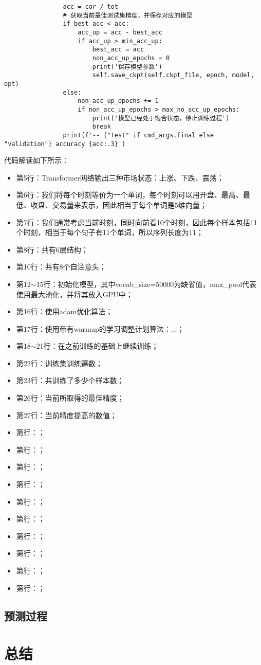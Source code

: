 \begin{lstlisting}
                acc = cor / tot
                # 获取当前最佳测试集精度，并保存对应的模型
                if best_acc < acc:
                    acc_up = acc - best_acc
                    if acc_up > min_acc_up:
                        best_acc = acc
                        non_acc_up_epochs = 0
                        print('保存模型参数')
                        self.save_ckpt(self.ckpt_file, epoch, model, opt)
                else:
                    non_acc_up_epochs += 1
                    if non_acc_up_epochs > max_no_acc_up_epochs:
                        print('模型已经处于饱合状态，停止训练过程')
                        break
                print(f'-- {"test" if cmd_args.final else "validation"} accuracy {acc:.3}')
\end{lstlisting}
代码解读如下所示：
\begin{itemize}
    \item 第5行：Transformer网络输出三种市场状态：上涨、下跌、震荡；
    \item 第6行：我们将每个时刻等价为一个单词，每个时刻可以用开盘、最高、最低、收盘、交易量来表示，因此相当于每个单词是5维向量；
    \item 第7行：我们通常考虑当前时刻，同时向前看10个时刻，因此每个样本包括11个时刻，相当于每个句子有11个单词，所以序列长度为11；
    \item 第8行：共有6层结构；
    \item 第10行：共有8个自注意头；
    \item 第12$\sim$15行：初始化模型，其中vocab\_size=50000为缺省值，max\_pool代表使用最大池化，并将其放入GPU中；
    \item 第16行：使用adam优化算法；
    \item 第17行：使用带有warmup的学习调整计划算法：...；
    \item 第18$\sim$21行：在之前训练的基础上继续训练；
    \item 第22行：训练集训练遍数；
    \item 第23行：共训练了多少个样本数；
    \item 第26行：当前所取得的最佳精度；
    \item 第27行：当前精度提高的数值；
    \item 第行：；
    \item 第行：；
    \item 第行：；
    \item 第行：；
    \item 第行：；
    \item 第行：；
    \item 第行：；
    \item 第行：；
    \item 第行：；
    \item 第行：；
\end{itemize}

\subsection{预测过程}

\section{总结}